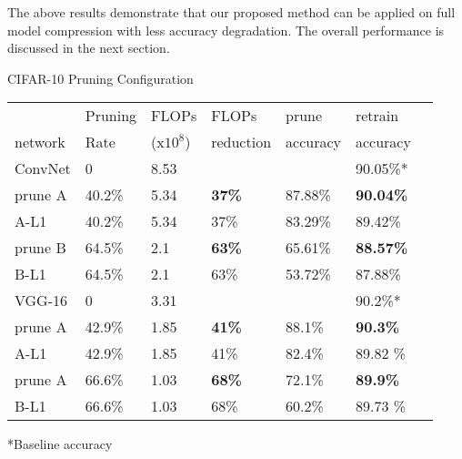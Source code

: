\documentclass{article} %
\begin{document}
The above results demonstrate that our proposed method can be applied on full model compression with less accuracy degradation.
The overall performance is discussed in the next section.
\caption{CIFAR-10 Pruning Configuration}
\centering
\begin{tabular}{lllllll}
\toprule
         &    Pruning    & FLOPs    & FLOPs          & prune    & retrain        \\
network  &    Rate       & (x$10^{8}$)  & reduction      & accuracy & accuracy       \\ \midrule
ConvNet  &           0   &  8.53      &                &          &  90.05\%*        \\
prune A  &        40.2\% &  5.34      &  \textbf{37\%}     & 87.88\%  &  \textbf{90.04\%}\\
A-L1     &        40.2\% &  5.34      &  37\%          & 83.29\%  &  89.42\%         \\
prune B  &        64.5\% &  2.1       &  \textbf{63\%}     & 65.61\%  &  \textbf{88.57\%}\\
B-L1    &        64.5\% &  2.1       &  63\%          & 53.72\%  &  87.88\%         \\ \bottomrule
VGG-16   &           0   &  3.31      &                &          &  90.2\%*         \\
prune A &        42.9\% &  1.85        &  \textbf{41\%}     &  88.1\%  &  \textbf{90.3\%} \\
A-L1     &        42.9\% &  1.85      &   41\%         &  82.4\%  &  89.82  \%       \\
prune A  &        66.6\% &  1.03        &  \textbf{68\%}     &  72.1\%  &  \textbf{89.9\%} \\
B-L1    &        66.6\% &  1.03      &   68\%         &  60.2\%  &  89.73   \%      \\ \bottomrule
\end{tabular}
\label{tab:CIFAR-10}
\caption*{\hspace{-65mm}\footnotesize{*Baseline accuracy}}
\vspace{-6mm}
\end{document}
